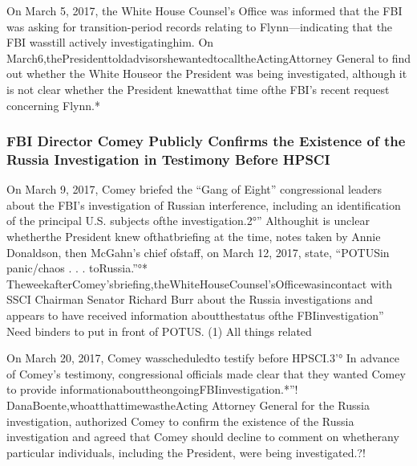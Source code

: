 On March 5, 2017, the White House Counsel’s Office was informed that the FBI was asking for transition-period records relating to Flynn—indicating that the FBI wasstill actively investigatinghim.
On March6,thePresidenttoldadvisorshewantedtocalltheActingAttorney General to find out whether the White Houseor the President was being investigated, although it is not clear whether the President knewatthat time ofthe FBI’s recent request concerning Flynn.*

\subsubsection{FBI Director Comey Publicly Confirms the Existence of the Russia Investigation in Testimony Before HPSCI}

On March 9, 2017, Comey briefed the “Gang of Eight” congressional leaders about the FBI’s investigation of Russian interference, including an identification of the principal U.S. subjects ofthe investigation.2°”
Althoughit is unclear whetherthe President knew ofthatbriefing at the time, notes taken by Annie Donaldson, then McGahn’s chief ofstaff, on March 12, 2017, state, “POTUSin panic/chaos . . .
toRussia.”°*
TheweekafterComey’sbriefing,theWhiteHouseCounsel’sOfficewasincontact with SSCI Chairman Senator Richard Burr about the Russia investigations and appears to have received information aboutthestatus ofthe FBIinvestigation”
Need binders to put in front of POTUS. (1) All things related

On March 20, 2017, Comey wasscheduledto testify before HPSCI.3'°
In advance of Comey’s testimony, congressional officials made clear that they wanted Comey to provide informationabouttheongoingFBIinvestigation.*''!
DanaBoente,whoatthattimewastheActing Attorney General for the Russia investigation, authorized Comey to confirm the existence of the Russia investigation and agreed that Comey should decline to comment on whetherany particular individuals, including the President, were being investigated.?!

